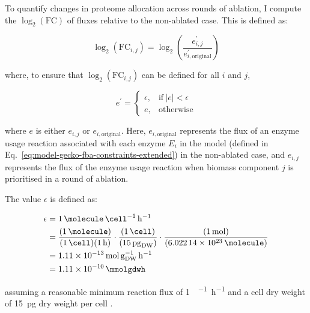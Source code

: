 To quantify changes in proteome allocation across rounds of ablation, I compute the $\log_{2}(\mathrm{FC})$ of fluxes relative to the non-ablated case.
This is defined as:

\begin{equation}
  \log_{2}(\mathrm{FC}_{i,j}) = \log_{2}\left( \frac{e_{i,j}^{\prime}}{e_{i, \mathrm{original}}^{\prime}} \right)
  \label{eq:model-foldchange}
\end{equation}

where, to ensure that $\log_{2}(\mathrm{FC}_{i,j})$ can be defined for all $i$ and $j$,

\begin{equation}
  e^{\prime} =
  \begin{cases}
    \epsilon, & \text{if}\ |e|<\epsilon \\
    e, & \text{otherwise}
  \end{cases}
  \label{eq:model-epsilon-round}
\end{equation}

where $e$ is either $e_{i,j}$ or $e_{i, \mathrm{original}}$.
Here, $e_{i, \mathrm{original}}$ represents the flux of an enzyme usage reaction associated with each enzyme $E_{i}$ in the model (defined in Eq.\ \ref{eq:model-gecko-fba-constraints-extended}) in the non-ablated case, and $e_{i,j}$ represents the flux of the enzyme usage reaction when biomass component $j$ is prioritised in a round of ablation.

The value $\epsilon$ is defined as:

\begin{equation}
  \begin{aligned}
    \epsilon &= \SI{1}{\molecule~\cell^{-1}~\hour^{-1}}\\
             &= \frac{(\SI{1}{\molecule})}{(\SI{1}{\cell})(\SI{1}{\hour})} \cdot \frac{(\SI{1}{\cell})}{(\SI{15}{\pico\gram_{DW}})} \cdot \frac{(\SI{1}{\mol})}{(\SI{6.02214d23}{\molecule)}}\\
             &= \SI{1.11d-13}{\mol~\gram_{DW}^{-1}~\hour^{-1}}\\
             &= \SI{1.11d-10}{\mmolgdwh}\\
  \end{aligned}
  \label{eq:model-epsilon}
\end{equation}

assuming a reasonable minimum reaction flux of \SI{1}{\molecule~\cell^{-1}~\hour^{-1}} and a cell dry weight of \SI{15}{\pico\gram} dry weight per cell \parencite{shermanGettingStartedYeast2002}.

